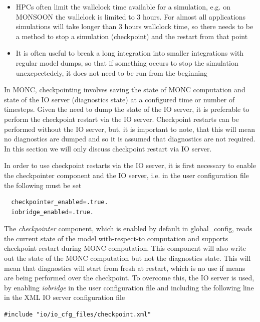 \documentclass[a4paper,11pt]{article}
\begin{document}
\begin{itemize}
  \item {HPCs often limit the wallclock time available for a simulation, e.g.
   on MONSOON the wallclock is limited to 3 hours. For almost all applications
   simulations will take longer than 3 hours wallclock time, so there needs to
   be a method to stop a simulation (checkpoint) and the restart from that point}
  \item {It is often useful to break a long integration into smaller integrations
  with regular model dumps, so that if something occurs to stop the simulation
  unexepectedely, it does not need to be run from the beginning}
\end{itemize}

In MONC, checkpointing involves saving the state of MONC computation and state
of the IO server (diagnostics state) at a configured time or number of timesteps.
Given the need to dump the state of the IO server, it is preferable to perform
the checkpoint restart via the IO server. Checkpoint restarts can be performed
without the IO server, but, it is important to note, that this will mean no diagnostics
are dumped and so it is assumed that diagnostics are not required. In this section
we will only discuss checkpoint restart via IO server.

In order to use checkpoint restarts via the IO server, it is first
necessary to enable the checkpointer component and the IO server, i.e. in the
user configuration file the following must be set
\begin{lstlisting}
  checkpointer_enabled=.true.
  iobridge_enabled=.true.
\end{lstlisting}

The \emph{checkpointer} component, which is enabled by default in global\_config,
reads the current state of the model with-respect-to computation and supports
checkpoint restart during MONC computation. This component will also
write out the state of the MONC computation but not the diagnostics state. This
will mean that diagnostics will start from fresh at restart, which is no use if
means are being performed over the checkpoint. To overcome this, the IO
server is used, by enabling \emph{iobridge} in the user configuration file and
including the following line in the XML IO server configuration file

\begin{lstlisting}[caption={Snippet of XML IO server configuration for
  checkpoint restarting from the IO server. Taken from
  io/io\_cfg\_files/data\_write\_1file.xml}]
  #include "io/io_cfg_files/checkpoint.xml"
\end{lstlisting}
\end{document}
